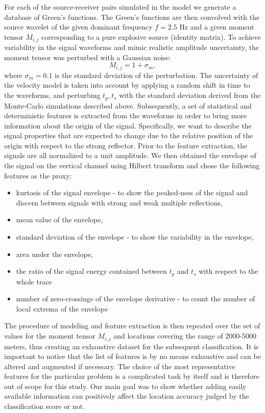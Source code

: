 For each of the source-receiver pairs simulated in the model we generate a database of Green's functions. The Green's functions are then convolved with the source wavelet of the given dominant frequency $f=2.5$ Hz and a given moment tensor $M_{i,j}$ corresponding to a pure explosive source (identity matrix). To achieve variability in the signal waveforms and mimic realistic amplitude uncertainty, the moment tensor was perturbed with a Gaussian noise:
\begin{equation}
 M_{i,j} = 1 + \sigma_{m},
\end{equation}
where $\sigma_{m} = 0.1$ is the standard deviation of the perturbation. The uncertainty of the velocity model is taken into account by applying a random shift in time to the waveforms, and perturbing $t_{p},t_{s}$ with the standard deviation derived from the Monte-Carlo simulations described above. Subsequently, a set of statistical and deterministic features is extracted from the waveforms in order to bring more information about the origin of the signal. Specifically, we want to describe the signal properties that are expected to change due to the relative position of the origin with respect to the strong reflector. Prior to the feature extraction, the signals are all normalized to a unit amplitude. We then obtained the envelope of the signal on the vertical channel using Hilbert transform and chose the following features as the proxy:
\begin{itemize}
 \item kurtosis of the signal envelope - to show the peaked-ness of the signal and discern between signals with strong and weak multiple reflections,
 \item mean value of the envelope,
 \item standard deviation of the envelope - to show the variability in the envelope,
 \item area under the envelope,
 \item the ratio of the signal energy contained between $t_{p}$ and $t_{s}$ with respect to the whole trace
 \item number of zero-crossings of the envelope derivative - to count the number of local extrema of the envelope
\end{itemize}

The procedure of modeling and feature extraction is then repeated over the set of values for the moment tensor $M_{i,j}$ and locations covering the range of 2000-5000 meters, thus creating an exhaustive dataset for the subsequent classification. It is important to notice that the list of features is by no means exhaustive and can be altered and augmented if necessary. The choice of the most representative features for the particular problem is a complicated task by itself and is therefore out of scope for this study. Our main goal was to show whether adding easily available information can positively affect the location accuracy judged by the classification score or not.
